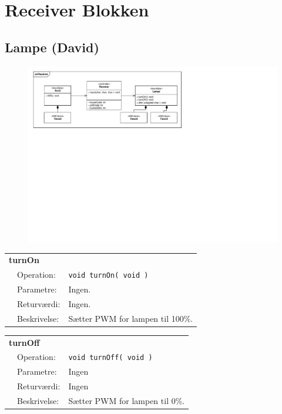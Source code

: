 \section{Receiver Blokken}

\subsection{Lampe (David)}

\begin{figure}[h]
\centering
\includegraphics[scale=1,clip=true, trim=361.8 462 335 50]{Systemarkitektur/diagrammer/Receiver_KlasseDiagram} %
\end{figure}

\begin{table}[h]
\begin{tabularx}{\textwidth}{p{0.6 cm} l X} %

\multicolumn{3}{l}{\textbf{turnOn}}\\
& Operation: & %
\texttt{void turnOn( void )}
\\ & Parametre: & %
Ingen.
\\ & Returværdi: & %
Ingen.
\\ & Beskrivelse: & %
Sætter PWM for lampen til 100\%.

\\ \end{tabularx}
\end{table}

\begin{table}[h]
\begin{tabularx}{\textwidth}{p{0.6 cm} l X} %

\multicolumn{3}{l}{\textbf{turnOff}}\\
& Operation: & %
\texttt{void turnOff( void )}
\\ & Parametre: & %
Ingen
\\ & Returværdi: & %
Ingen
\\ & Beskrivelse: & %
Sætter PWM for lampen til 0\%.

\\ \end{tabularx}
\end{table}

